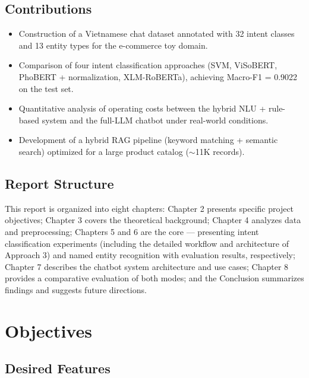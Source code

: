 \documentclass[12pt, a4paper]{report}
\begin{document}
\section{Contributions}

\begin{itemize}
  \item Construction of a Vietnamese chat dataset annotated with
        32 intent classes and 13 entity types for the e-commerce toy domain.
  \item Comparison of four intent classification approaches
        (SVM, ViSoBERT, PhoBERT + normalization, XLM-RoBERTa),
        achieving Macro-F1 = 0.9022 on the test set.
  \item Quantitative analysis of operating costs between the hybrid NLU + rule-based
        system and the full-LLM chatbot under real-world conditions.
  \item Development of a hybrid RAG pipeline (keyword matching + semantic search)
        optimized for a large product catalog ($\sim$11K records).
\end{itemize}

\section{Report Structure}

This report is organized into eight chapters:
Chapter 2 presents specific project objectives;
Chapter 3 covers the theoretical background;
Chapter 4 analyzes data and preprocessing;
Chapters 5 and 6 are the core --- presenting intent classification experiments
(including the detailed workflow and architecture of Approach 3)
and named entity recognition with evaluation results, respectively;
Chapter 7 describes the chatbot system architecture and use cases;
Chapter 8 provides a comparative evaluation of both modes;
and the Conclusion summarizes findings and suggests future directions.

\chapter{Objectives}

\section{Desired Features}
\end{document}
